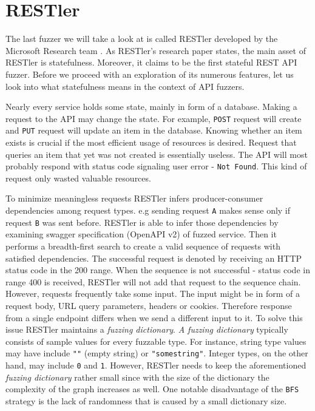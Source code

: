\section{RESTler}
\label{sec:restler}
The last fuzzer we will take a look at is called RESTler developed by the Microsoft Research team \cite{atlidakis2019restler}. As RESTler's research paper states, the main asset of RESTler is statefulness. Moreover, it claims to be the first stateful REST API fuzzer. Before we proceed with an exploration of its numerous features, let us look into what statefulness means in the context of API fuzzers.

Nearly every service holds some state, mainly in form of a database. Making a request to the API may change the state. For example, \texttt{POST} request will create and \texttt{PUT} request will update an item in the database. Knowing whether an item exists is crucial if the most efficient usage of resources is desired. Request that queries an item that yet was not created is essentially useless. The API will most probably respond with status code signaling user error - \texttt{Not Found}. This kind of request only wasted valuable resources.

To minimize meaningless requests RESTler infers producer-consumer dependencies among request types. e.g sending request \texttt{A} makes sense only if request \texttt{B} was sent before. RESTler is able to infer those dependencies by examining swagger specification (OpenAPI v2) of fuzzed service. Then it performs a breadth-first search to create a valid sequence of requests with satisfied dependencies. The successful request is denoted by receiving an HTTP status code in the 200 range. When the sequence is not successful - status code in range 400 is received, RESTler will not add that request to the sequence chain. However, requests frequently take some input. The input might be in form of a request body, URL query parameters, headers or cookies. Therefore response from a single endpoint differs when we send a different input to it. To solve this issue RESTler maintains a \textit{fuzzing dictionary}. \textit{A fuzzing dictionary} typically consists of sample values for every fuzzable type. For instance, string type values may have include \texttt{""} (empty string) or \texttt{"somestring"}. Integer types, on the other hand, may include \texttt{0} and \texttt{1}. However, RESTler needs to keep the aforementioned \textit{fuzzing dictionary} rather small since with the size of the dictionary the complexity of the graph increases as well. One notable disadvantage of the \texttt{BFS} strategy is the lack of randomness that is caused by a small dictionary size.


